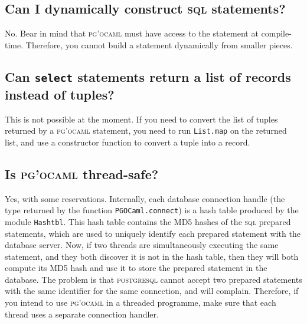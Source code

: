 \documentclass[11pt]{article}
\newcommand{\postgresql}{\textsc{postgresql}\xspace}
\newcommand{\sql}{\textsc{sql}\xspace}
\newcommand{\pgocaml}{\textsc{pg'ocaml}\xspace}
\begin{document}
\subsection{Can I dynamically construct \sql statements?}

No.  Bear in mind that \pgocaml must have access to the statement at compile-time.
Therefore, you cannot build a statement dynamically from smaller pieces.


\subsection{Can \texttt{select} statements return a list of records instead of tuples?}

This is not possible at the moment.  If you need to convert the list of tuples returned
by a \pgocaml statement, you need to run \texttt{List.map} on the returned list,
and use a constructor function to convert a tuple into a record.


\subsection{Is \pgocaml thread-safe?}

Yes, with some reservations.  Internally, each database connection handle (the type
returned by the function \texttt{PGOCaml.connect}) is a hash table produced by the
module \texttt{Hashtbl}.  This hash table contains the MD5 hashes of the \sql prepared
statements, which are used to uniquely identify each prepared statement with the
database server.  Now, if two threads are simultaneously executing the same statement,
and they both discover it is not in the hash table, then they will both compute its
MD5 hash and use it to store the prepared statement in the database.  The problem is
that \postgresql cannot accept two prepared statements with the same identifier for
the same connection, and will complain.  Therefore, if you intend to use \pgocaml in
a threaded programme, make sure that each thread uses a separate connection handler.
\end{document}
